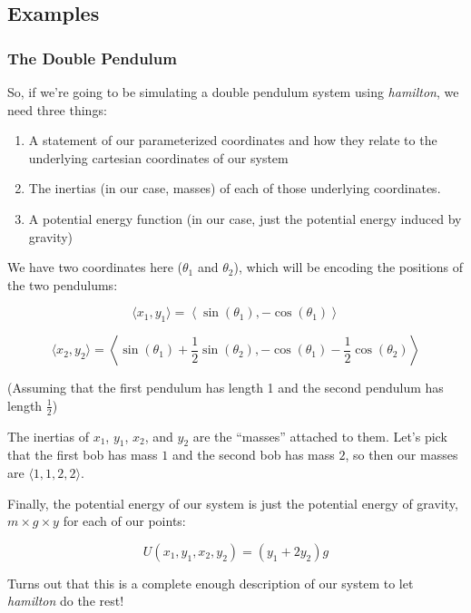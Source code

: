 \documentclass[]{article}
\begin{document}
\subsection{Examples}\label{examples}

\subsubsection{The Double Pendulum}\label{the-double-pendulum}

So, if we're going to be simulating a double pendulum system using
\emph{hamilton}, we need three things:

\begin{enumerate}
\def\labelenumi{\arabic{enumi}.}
\item
  A statement of our parameterized coordinates and how they relate to the
  underlying cartesian coordinates of our system
\item
  The inertias (in our case, masses) of each of those underlying coordinates.
\item
  A potential energy function (in our case, just the potential energy induced by
  gravity)
\end{enumerate}

We have two coordinates here (\(\theta_1\) and \(\theta_2\)), which will be
encoding the positions of the two pendulums:

\[
\langle x_1, y_1 \rangle =
  \left\langle \sin (\theta_1), - \cos (\theta_1) \right\rangle
\]

\[
\langle x_2, y_2 \rangle =
  \left\langle \sin (\theta_1) + \frac{1}{2} \sin (\theta_2),
    - \cos (\theta_1) - \frac{1}{2} \cos (\theta_2) \right\rangle
\]

(Assuming that the first pendulum has length 1 and the second pendulum has
length \(\frac{1}{2}\))

The inertias of \(x_1\), \(y_1\), \(x_2\), and \(y_2\) are the ``masses''
attached to them. Let's pick that the first bob has mass \(1\) and the second
bob has mass \(2\), so then our masses are \(\langle 1, 1, 2, 2 \rangle\).

Finally, the potential energy of our system is just the potential energy of
gravity, \(m \times g \times y\) for each of our points:

\[
U(x_1, y_1, x_2, y_2) = ( y_1 + 2 y_2 ) g
\]

Turns out that this is a complete enough description of our system to let
\emph{hamilton} do the rest!
\end{document}
